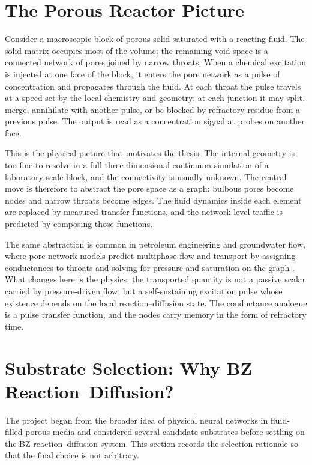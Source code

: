 
\section{The Porous Reactor Picture}
\label{sec:porous_picture}

Consider a macroscopic block of porous solid saturated with a reacting fluid.
The solid matrix occupies most of the volume; the remaining void space is a connected network of pores joined by narrow throats.
When a chemical excitation is injected at one face of the block, it enters the pore network as a pulse of concentration and propagates through the fluid.
At each throat the pulse travels at a speed set by the local chemistry and geometry; at each junction it may split, merge, annihilate with another pulse, or be blocked by refractory residue from a previous pulse.
The output is read as a concentration signal at probes on another face.

This is the physical picture that motivates the thesis.
The internal geometry is too fine to resolve in a full three-dimensional continuum simulation of a laboratory-scale block, and the connectivity is usually unknown.
The central move is therefore to abstract the pore space as a graph: bulbous pores become nodes and narrow throats become edges.
The fluid dynamics inside each element are replaced by measured transfer functions, and the network-level traffic is predicted by composing those functions.

The same abstraction is common in petroleum engineering and groundwater flow, where pore-network models predict multiphase flow and transport by assigning conductances to throats and solving for pressure and saturation on the graph \cite{xiong2016review, blunt2017multiphase}.
What changes here is the physics: the transported quantity is not a passive scalar carried by pressure-driven flow, but a self-sustaining excitation pulse whose existence depends on the local reaction--diffusion state.
The conductance analogue is a pulse transfer function, and the nodes carry memory in the form of refractory time.

\section{Substrate Selection: Why BZ Reaction--Diffusion?}
\label{sec:porous_substrate_selection}

The project began from the broader idea of physical neural networks in fluid-filled porous media and considered several candidate substrates before settling on the BZ reaction--diffusion system.
This section records the selection rationale so that the final choice is not arbitrary.

